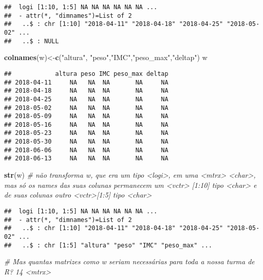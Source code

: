 \documentclass[]{article}
\newenvironment{Shaded}{\begin{snugshade}}{\end{snugshade}}
\newcommand{\KeywordTok}[1]{\textcolor[rgb]{0.13,0.29,0.53}{\textbf{#1}}}
\newcommand{\StringTok}[1]{\textcolor[rgb]{0.31,0.60,0.02}{#1}}
\newcommand{\CommentTok}[1]{\textcolor[rgb]{0.56,0.35,0.01}{\textit{#1}}}
\newcommand{\NormalTok}[1]{#1}
\begin{document}
\begin{verbatim}
##  logi [1:10, 1:5] NA NA NA NA NA NA ...
##  - attr(*, "dimnames")=List of 2
##   ..$ : chr [1:10] "2018-04-11" "2018-04-18" "2018-04-25" "2018-05-02" ...
##   ..$ : NULL
\end{verbatim}

\begin{Shaded}
\begin{Highlighting}[]
\KeywordTok{colnames}\NormalTok{(w)<-}\KeywordTok{c}\NormalTok{(}\StringTok{"altura"}\NormalTok{, }\StringTok{"peso"}\NormalTok{,}\StringTok{"IMC"}\NormalTok{,}\StringTok{"peso_max"}\NormalTok{,}\StringTok{"deltap"}\NormalTok{)}
\NormalTok{w}
\end{Highlighting}
\end{Shaded}

\begin{verbatim}
##            altura peso IMC peso_max deltap
## 2018-04-11     NA   NA  NA       NA     NA
## 2018-04-18     NA   NA  NA       NA     NA
## 2018-04-25     NA   NA  NA       NA     NA
## 2018-05-02     NA   NA  NA       NA     NA
## 2018-05-09     NA   NA  NA       NA     NA
## 2018-05-16     NA   NA  NA       NA     NA
## 2018-05-23     NA   NA  NA       NA     NA
## 2018-05-30     NA   NA  NA       NA     NA
## 2018-06-06     NA   NA  NA       NA     NA
## 2018-06-13     NA   NA  NA       NA     NA
\end{verbatim}

\begin{Shaded}
\begin{Highlighting}[]
\KeywordTok{str}\NormalTok{(w) }\CommentTok{# não transforma w, que era um tipo <logi>, em uma <mtrx> <char>, mas só os names das suas colunas permanecem um <vctr> [1:10] tipo <char> e de suas colunas outro <vctr>[1:5] tipo <char>}
\end{Highlighting}
\end{Shaded}

\begin{verbatim}
##  logi [1:10, 1:5] NA NA NA NA NA NA ...
##  - attr(*, "dimnames")=List of 2
##   ..$ : chr [1:10] "2018-04-11" "2018-04-18" "2018-04-25" "2018-05-02" ...
##   ..$ : chr [1:5] "altura" "peso" "IMC" "peso_max" ...
\end{verbatim}

\begin{Shaded}
\begin{Highlighting}[]
\CommentTok{# Mas quantas matrizes como w seriam necessárias para toda a nossa turma de R? 14 <mtrx>}
\end{Highlighting}
\end{Shaded}
\end{document}

